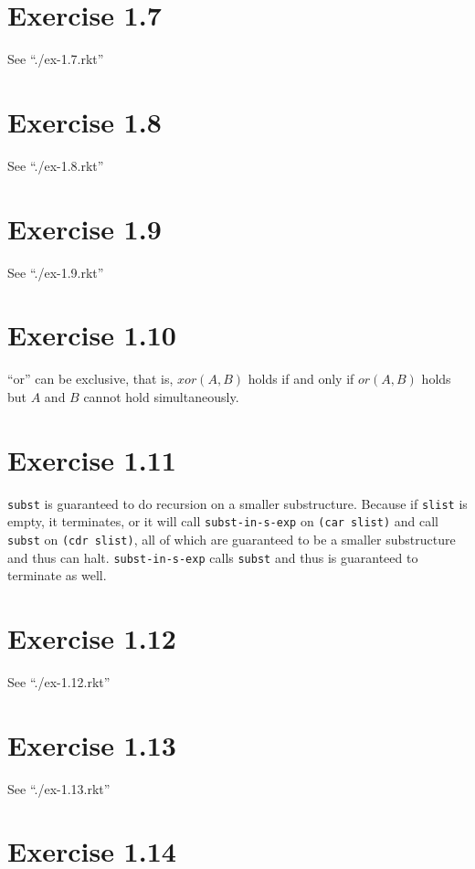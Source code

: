 \documentclass[11pt,a4paper]{article}
\begin{document}
\section{Exercise 1.7}

See ``./ex-1.7.rkt''

\section{Exercise 1.8}

See ``./ex-1.8.rkt''

\section{Exercise 1.9}

See ``./ex-1.9.rkt''

\section{Exercise 1.10}

``or'' can be exclusive, that is, $xor(A,B)$ holds if and only if
$or(A,B)$ holds but $A$ and $B$ cannot hold simultaneously. 

\section{Exercise 1.11}

\texttt{subst} is guaranteed to do recursion on a smaller substructure.
Because if \texttt{slist} is empty, it terminates, or it will call
\texttt{subst-in-s-exp} on \texttt{(car slist)} and call
\texttt{subst} on \texttt{(cdr slist)}, all of which are guaranteed to
be a smaller substructure and thus can halt.
\texttt{subst-in-s-exp} calls \texttt{subst} and thus is guaranteed to
terminate as well.

\section{Exercise 1.12}

See ``./ex-1.12.rkt''

\section{Exercise 1.13}

See ``./ex-1.13.rkt''

\section{Exercise 1.14}
\end{document}
